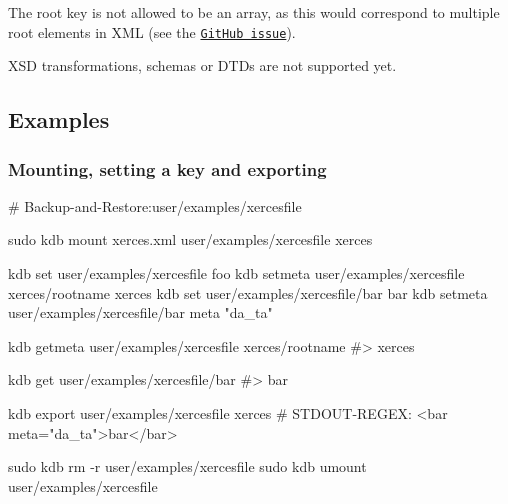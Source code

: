 The root key is not allowed to be an array, as this would correspond to multiple root elements in X\+ML (see the \href{https://github.com/ElektraInitiative/libelektra/issues/1451}{\tt Git\+Hub issue}).

X\+SD transformations, schemas or D\+T\+Ds are not supported yet.

\subsection*{Examples}

\subsubsection*{Mounting, setting a key and exporting}


\begin{DoxyCode}
# Backup-and-Restore:user/examples/xercesfile

sudo kdb mount xerces.xml user/examples/xercesfile xerces

kdb set user/examples/xercesfile foo
kdb setmeta user/examples/xercesfile xerces/rootname xerces
kdb set user/examples/xercesfile/bar bar
kdb setmeta user/examples/xercesfile/bar meta "da\_ta"

kdb getmeta user/examples/xercesfile xerces/rootname
#> xerces

kdb get user/examples/xercesfile/bar
#> bar

kdb export user/examples/xercesfile xerces
# STDOUT-REGEX: <bar meta="da\_ta">bar</bar>

sudo kdb rm -r user/examples/xercesfile
sudo kdb umount user/examples/xercesfile
\end{DoxyCode}
 